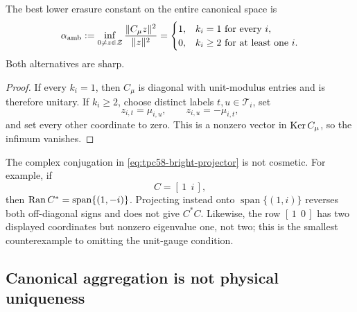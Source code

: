 \begin{proposition}
\label{prop:tpc58-sharp-ambient-obstruction}
The best lower erasure constant on the entire canonical space is
\begin{equation}
 \alpha_{\rm amb}
 :=\inf_{0\ne z\in\mathcal Z}
   \frac{\|C_\mu z\|^2}{\|z\|^2}
 =
 \begin{cases}
  1,&k_i=1\text{ for every }i,\\
  0,&k_i\ge2\text{ for at least one }i.
 \end{cases}
 \label{eq:tpc58-sharp-ambient-constant}
\end{equation}
Both alternatives are sharp.
\end{proposition}

\begin{proof}
If every \(k_i=1\), then \(C_\mu\) is diagonal with unit-modulus entries
and is therefore unitary.  If \(k_i\ge2\), choose distinct labels
\(t,u\in\mathcal T_i\), set
\begin{equation}
 z_{i,t}=\mu_{i,u},
 \qquad z_{i,u}=-\mu_{i,t},
 \label{eq:tpc58-two-label-dark-vector}
\end{equation}
and set every other coordinate to zero.  This is a nonzero vector in
\(\operatorname{Ker} C_\mu\), so the infimum vanishes.
\end{proof}

The complex conjugation in
\eqref{eq:tpc58-bright-projector} is not cosmetic.  For example, if
\begin{equation}
 C=[\,1\ \ i\,],
 \label{eq:tpc58-complex-gauge-counterexample}
\end{equation}
then \(\operatorname{Ran} C^*=\operatorname{span}\{(1,-i)\}\).  Projecting instead onto
\(\operatorname{span}\{(1,i)\}\) reverses both off-diagonal signs and does
not give \(C^*C\).  Likewise, the row \([\,1\ \ 0\,]\) has two displayed
coordinates but nonzero eigenvalue one, not two; this is the smallest
counterexample to omitting the unit-gauge condition.

\subsection{Canonical aggregation is not physical uniqueness}

